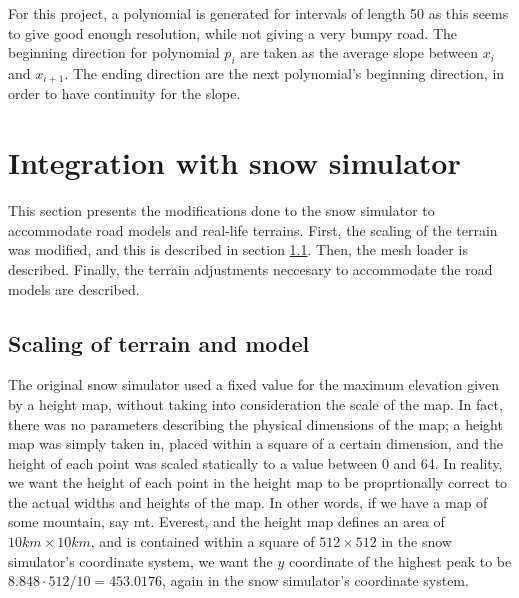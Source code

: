 For this project, a polynomial is generated for intervals of length 50 as this seems to give good enough resolution, while not giving a very bumpy road. The beginning direction for polynomial $p_i$ are taken as the average slope between $x_i$ and $x_{i+1}$. The ending direction are the next polynomial's beginning direction, in order to have continuity for the slope.


\section{Integration with snow simulator}
\label{sec:impl_snowsim}
This section presents the modifications done to the snow simulator to accommodate road models and real-life terrains. First, the scaling of the terrain was modified, and this is described in section \ref{sec:terrain_scaling}. Then, the mesh loader is described. Finally, the terrain adjustments neccesary to accommodate the road models are described.

\subsection{Scaling of terrain and model}
\label{sec:terrain_scaling}
The original snow simulator used a fixed value for the maximum elevation given by a height map, without taking into consideration the scale of the map. In fact, there was no parameters describing the physical dimensions of the map; a height map was simply taken in, placed within a square of a certain dimension, and the height of each point was scaled statically to a value between 0 and 64. In reality, we want the height of each point in the height map to be proprtionally correct to the actual widths and heights of the map. In other words, if we have a map of some mountain, say mt. Everest, and the height map defines an area of $10km\times 10km$, and is contained within a square of $512\times 512$ in the snow simulator's coordinate system, we want the $y$ coordinate of the highest peak to be $8.848\cdot 512/10 = 453.0176$, again in the snow simulator's coordinate system.

